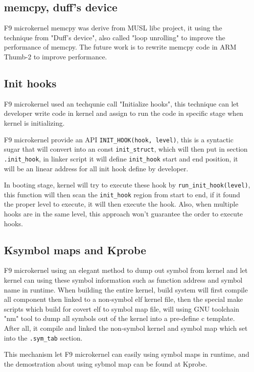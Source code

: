 \documentclass[10pt,preprint,nocopyrightspace]{sigplanconf}
\begin{document}
\subsection{memcpy, duff's device}
F9 microkernel memcpy was derive from MUSL libc project\cite{felker}, it using the technique from "Duff's device", also called "loop unrolling" to improve the performance of memcpy. The future work is to rewrite memcpy code in ARM Thumb-2 to improve performance.

\subsection{Init hooks}

F9 microkernel used an techqunie call "Initialize hooks", this technique can let developer write code in kernel and assign to run the code in specific stage when kernel is initializing.

F9 microkernel provide an API \verb|INIT_HOOK(hook, level)|, this is a syntactic sugar that will convert into an const \verb|init_struct|, which will then put in section \verb|.init_hook|, in linker script it will define \verb|init_hook| start and end position, it will be an linear address for all init hook define by developer.

In booting stage, kernel will try to execute these hook by \verb|run_init_hook(level)|, this function will then scan the \verb|init_hook| region from start to end, if it found the proper level to execute, it will then execute the hook. Also, when multiple hooks are in the same level, this approach won't guarantee the order to execute hooks.

\subsection{Ksymbol maps and Kprobe}
F9 microkernel using an elegant method to dump out symbol from kernel and let kernel can using these symbol information such as function address and symbol name in runtime. When building the entire kernel, build system will first compile all component then linked to a non-symbol elf kernel file, then the special make scripts which build for covert elf to symbol map file, will using GNU toolchain "nm" tool to dump all symbols out of the kernel into a pre-define c template. After all, it compile and linked the non-symbol kernel and symbol map which set into the \texttt{.sym\_tab} section.

This mechanism let F9 microkernel can easily using symbol maps in runtime, and the demostration about using sybmol map can be found at Kprobe.
\end{document}
